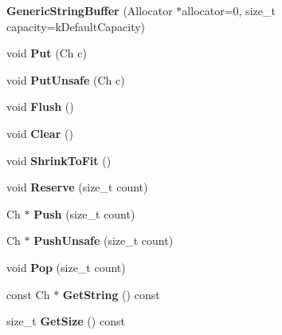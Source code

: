 \begin{DoxyCompactItemize}
{\bfseries Generic\+String\+Buffer} (Allocator $\ast$allocator=0, size\+\_\+t capacity=k\+Default\+Capacity)
\item 
\mbox{\label{classGenericStringBuffer_a8be5c8fadccacdcf40e20220f38e0afa}} 
void {\bfseries Put} (Ch c)
\item 
\mbox{\label{classGenericStringBuffer_a9225468d11fdddfc3a9a4e48bf4d3ba4}} 
void {\bfseries Put\+Unsafe} (Ch c)
\item 
\mbox{\label{classGenericStringBuffer_a28bb539487db17b07314a532f3b8847c}} 
void {\bfseries Flush} ()
\item 
\mbox{\label{classGenericStringBuffer_a42f15c959046d899cb74c3120a6995f9}} 
void {\bfseries Clear} ()
\item 
\mbox{\label{classGenericStringBuffer_a0dbdb77489b95923795011a24f705be5}} 
void {\bfseries Shrink\+To\+Fit} ()
\item 
\mbox{\label{classGenericStringBuffer_a4d6becae201b98c122746298882a318f}} 
void {\bfseries Reserve} (size\+\_\+t count)
\item 
\mbox{\label{classGenericStringBuffer_a49fd10cdd5dd97a4cf9813d01334d660}} 
Ch $\ast$ {\bfseries Push} (size\+\_\+t count)
\item 
\mbox{\label{classGenericStringBuffer_a4e396f55323ca54f949685c7c6ef2060}} 
Ch $\ast$ {\bfseries Push\+Unsafe} (size\+\_\+t count)
\item 
\mbox{\label{classGenericStringBuffer_a0038e53ba03c271bc4cbbac403ec4de4}} 
void {\bfseries Pop} (size\+\_\+t count)
\item 
\mbox{\label{classGenericStringBuffer_ab06b8c5f1385bd3dfd4caea8b7510f0b}} 
const Ch $\ast$ {\bfseries Get\+String} () const
\item 
\mbox{\label{classGenericStringBuffer_a725e862b9a78375f5363b0b61ad789f3}} 
size\+\_\+t {\bfseries Get\+Size} () const
\end{DoxyCompactItemize}
